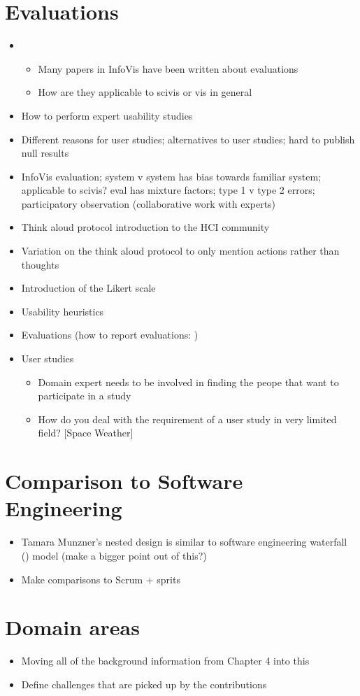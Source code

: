 \section{Evaluations}
\begin{itemize}
\item \begin{itemize}
    \item Many papers in InfoVis have been written about evaluations
    \item How are they applicable to scivis or vis in general
\end{itemize}
\item \cite{tory2005evaluating} How to perform expert usability studies
\item \cite{kosara2003thoughts} Different reasons for user studies; alternatives to user studies; hard to publish null results
\item \cite{carpendale2008evaluating} InfoVis evaluation; system v system has bias towards familiar system; applicable to scivis? eval has mixture factors; type 1 v type 2 errors; participatory observation (collaborative work with experts)
\item \cite{lewis1993task} Think aloud protocol introduction to the HCI community
\item \cite{ericsson1980verbal} Variation on the think aloud protocol to only mention actions rather than thoughts
\item \cite{likert1932technique} Introduction of the Likert scale
\item \cite{nielsen1994heuristic} Usability heuristics
\item Evaluations \cite{plaisant2004challenge} (how to report evaluations: \cite{forsell2012guide})
\item User studies
\begin{itemize}
  \item Domain expert needs to be involved in finding the peope that want to participate in a study
  \item How do you deal with the requirement of a user study in very limited field? [Space Weather]
\end{itemize}

\end{itemize}

\section{Comparison to Software Engineering}
\begin{itemize}
\item Tamara Munzner's nested design is similar to software engineering waterfall (\cite{royce1970managing, victor2003iterative}) model (make a bigger point out of this?)
\item Make comparisons to Scrum + sprits
\end{itemize}

\section{Domain areas}
\label{app:domain}

\begin{itemize}
\item Moving all of the background information from Chapter 4 into this
\item Define challenges that are picked up by the contributions
\end{itemize}

